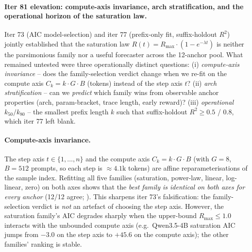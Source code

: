 \paragraph{Iter 81 elevation: compute-axis invariance, arch stratification, and the
operational horizon of the saturation law.}
\label{par:scaling-iter81}
Iter 73 (AIC model-selection) and iter 77 (prefix-only fit, suffix-holdout
$R^2$) jointly established that the saturation law
$R(t) = R_\mathrm{max} \cdot (1 - e^{-\lambda t})$ is neither the
parsimonious family nor a useful forecaster across the 12-anchor pool.
What remained untested were three operationally distinct questions:
(i) \emph{compute-axis invariance} -- does the family-selection verdict
change when we re-fit on the compute axis $C_k = k \cdot G \cdot B$
(tokens) instead of the step axis $t$?  (ii) \emph{arch stratification}
-- can we \emph{predict} which family wins from observable anchor
properties (arch, param-bracket, trace length, early reward)?  (iii)
\emph{operational $k_{50}/k_{80}$} -- the smallest prefix length $k$
such that suffix-holdout $R^2 \ge 0.5$ / $0.8$, which iter 77 left
blank.

\paragraph{Compute-axis invariance.}
\label{par:scaling-iter81-compute}
The step axis $t \in \{1,\dots,n\}$ and the compute axis
$C_k = k \cdot G \cdot B$ (with $G=8$, $B=512$ prompts, so each step is
$\approx 4.1 \mathrm{k}$ tokens) are affine reparameterisations of the
sample index.  Refitting all five families (saturation, power-law,
linear, log-linear, zero) on both axes shows that the \emph{best family
is identical on both axes for every anchor} (12/12 agree;
).  This sharpens iter 73's falsification:
the family-selection verdict is \emph{not} an artefact of choosing the
step axis.  However, the saturation family's AIC degrades sharply when
the upper-bound $R_\mathrm{max} \le 1.0$ interacts with the unbounded
compute axis (e.g.\ Qwen3.5-4B saturation AIC jumps from $-3.0$ on the
step axis to $+45.6$ on the compute axis); the other families'
ranking is stable.

